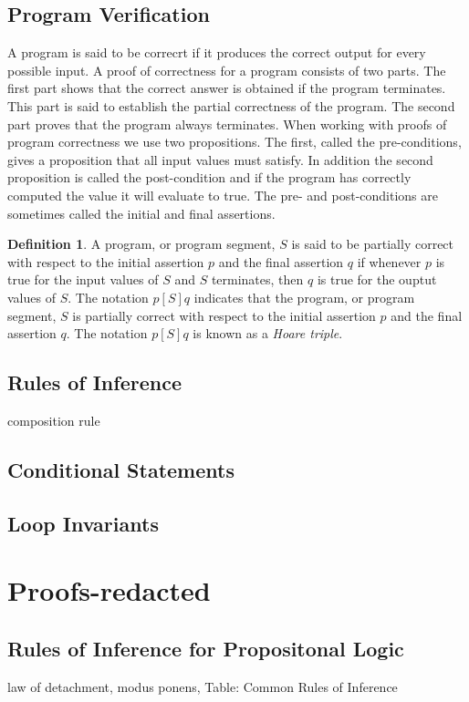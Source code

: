 \documentclass[11pt]{book} %
\theoremstyle {definition}
\newtheorem {definition}{Definition}[section]
\theoremstyle {remark}
\begin{document}
  \subsection {Program Verification}A program is said to be correcrt if it produces the correct output for every possible input. A proof of correctness for a program consists of two parts. The first part shows that the correct answer is obtained if the program terminates. This part is said to establish the partial correctness of the program. The second part proves that the program always terminates. When working with proofs of program correctness we use two propositions. The first, called the pre-conditions, gives a proposition that all input values must satisfy. In addition the second proposition is called the post-condition and if the program has correctly computed the value it will evaluate to true. The pre- and post-conditions are sometimes called the initial and final assertions.

\begin{definition}
A program, or program segment, $S$ is said to be partially correct with respect to the initial assertion $p$ and the final assertion $q$ if whenever $p$ is true for the input values of $S$ and $S$ terminates, then $q$ is true for the ouptut values of $S$. The notation $p[S]q$ indicates that the program, or program segment, $S$ is partially correct with respect to the initial assertion $p$ and the final assertion $q$. The notation $p[S]q$ is known as a \textit{Hoare triple}.
\end{definition}

  \subsection {Rules of Inference}
composition rule
  \subsection {Conditional Statements}
  \subsection {Loop Invariants}
        
\newpage


\section {Proofs-redacted}
  \subsection {Rules of Inference for Propositonal Logic}
law of detachment, modus ponens, 
Table: Common Rules of Inference
\end{document}
